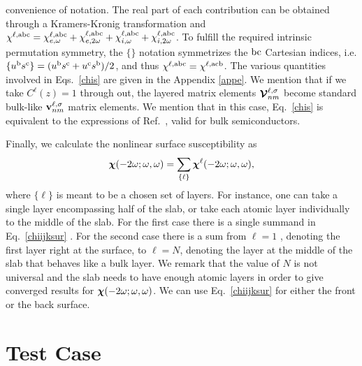 \documentclass[floatfix,prb,aps,superscriptaddress,11pt,preprint,letterpaper]{revtex4}
\def\chon{red}
\begin{document}
{\color{\chon} convenience of notation}.
The real part of each contribution can be obtained through
a Kramers-Kronig transformation\cite{nicolas} {\color{\chon} and}
$\chi^{\ell,\mathrm{a}\mathrm{b}\mathrm{c}}=
\chi^{\ell,\mathrm{a}\mathrm{b}\mathrm{c}}_{e,\omega} 
+\chi^{\ell,\mathrm{a}\mathrm{b}\mathrm{c}}_{e,2\omega}
+\chi^{\ell,\mathrm{a}\mathrm{b}\mathrm{c}}_{i,\omega} 
+\chi^{\ell,\mathrm{a}\mathrm{b}\mathrm{c}}_{i,2\omega}
$.
To fulfill the required intrinsic permutation symmetry, %
the $\{\}$ notation symmetrizes the $\mathrm{b}\mathrm{c}$ Cartesian indices, i.e. 
$\{u^{\mathrm{b}}s^{\mathrm{c}}\}=(u^{\mathrm{b}}s^{\mathrm{c}}+u^{\mathrm{c}}s^{\mathrm{b}})/2$,
and thus
$\chi^{\ell,\mathrm{a}\mathrm{b}\mathrm{c}}=\chi^{\ell,\mathrm{a}\mathrm{c}\mathrm{b}}$.
The various quantities involved in Eqs.~\eqref{chis} are given in
the Appendix \ref{appe}. 
We mention that if we take $C^\ell(z)=1$ through out, the layered
matrix elements $\boldsymbol{\mathcal{\cal V}}^{\ell,\sigma}_{nm}$ become standard bulk-like
$\mathbf{v}^{\ell,\sigma}_{nm}$ matrix elements. We mention that in this
case, Eq.~\eqref{chis} is equivalent to the expressions of
Ref.~, valid for bulk semiconductors.
 
Finally, we calculate the nonlinear surface susceptibility as 
\begin{equation}\label{chiijksur}
\boldsymbol{\chi}(-2\omega;\omega,\omega)
= \sum_{\{\ell\}}\boldsymbol{\chi}^{\ell}(-2\omega;\omega,\omega),
\end{equation} 
where $\{\ell\}$
is meant to be {\color{\chon} a chosen set of layers.} For instance, 
one {\color{\chon} can take a single layer 
encompassing} half of the slab, or {\color{\chon} take each 
atomic layer individually to the middle} 
of the slab. {\color{\chon} For} the first case there is 
{\color{\chon} a} single summand
in Eq.~\eqref{chiijksur}{\color{\chon} . For the second case
there is} a sum from $\ell=1${\color{\chon} , denoting the first layer 
right at the surface, to $\ell=N$, denoting the layer at the middle of the slab 
that behaves like a bulk layer.}
We {\color{\chon} remark} that the value of 
$N$ is not universal {\color{\chon} and} 
the slab needs to have enough atomic layers 
{\color{\chon} in} order to give converged results for 
$\boldsymbol{\chi} (-2\omega;\omega,\omega)$. 
We can use Eq.~\eqref{chiijksur} for 
either the front or the back surface. 

\section{Test Case}\label{results}
\end{document}
